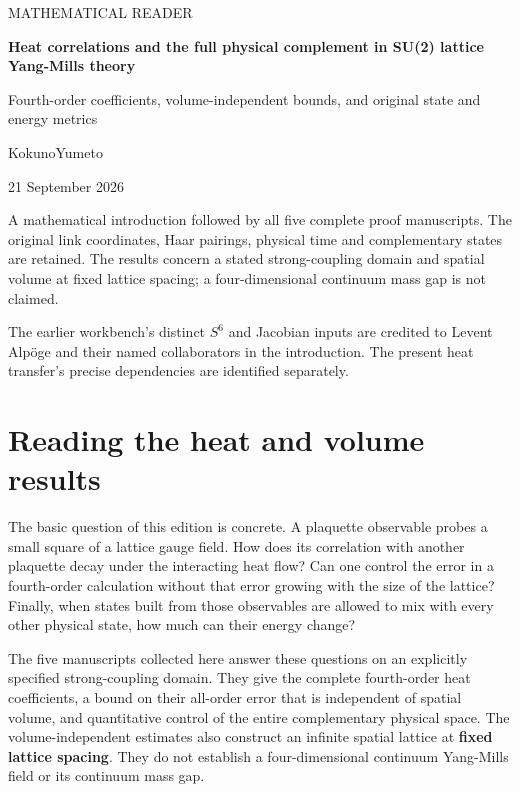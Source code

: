 \documentclass[11pt,a4paper]{article}
\let\originalsection\section
\renewcommand{\section}{\clearpage\originalsection}
\renewcommand{\[}{\begingroup\small\originaldisplaystart}
\renewcommand{\]}{\originaldisplayend\endgroup}
\begin{document}
\begin{titlepage}
\vspace*{14mm}
{\sffamily\Large MATHEMATICAL READER\par}
\vspace{12mm}
{\LARGE\bfseries Heat correlations and the full physical complement in
SU(2) lattice Yang-Mills theory\par}
\vspace{9mm}
{\large Fourth-order coefficients, volume-independent bounds, and
original state and energy metrics\par}
\vspace{13mm}
{\large KokunoYumeto\par}
\vspace{3mm}
{21 September 2026\par}
\vfill
\begin{minipage}{0.96\textwidth}
A mathematical introduction followed by all five complete proof manuscripts. The original link coordinates, Haar pairings, physical time and complementary states are retained. The results concern a stated strong-coupling domain and spatial volume at fixed lattice spacing; a four-dimensional continuum mass gap is not claimed.

\medskip
The earlier workbench's distinct \(S^6\) and Jacobian inputs are credited to Levent Alpöge and their named collaborators in the introduction. The present heat transfer's precise dependencies are identified separately.
\end{minipage}
\vspace{10mm}
\end{titlepage}
\tableofcontents
\clearpage
{}
\section{Reading the heat and volume
results}\label{reading-the-heat-and-volume-results}

The basic question of this edition is concrete. A plaquette observable
probes a small square of a lattice gauge field. How does its correlation
with another plaquette decay under the interacting heat flow? Can one
control the error in a fourth-order calculation without that error
growing with the size of the lattice? Finally, when states built from
those observables are allowed to mix with every other physical state,
how much can their energy change?

The five manuscripts collected here answer these questions on an
explicitly specified strong-coupling domain. They give the complete
fourth-order heat coefficients, a bound on their all-order error that is
independent of spatial volume, and quantitative control of the entire
complementary physical space. The volume-independent estimates also
construct an infinite spatial lattice at \textbf{fixed lattice spacing}.
They do not establish a four-dimensional continuum Yang-Mills field or
its continuum mass gap.
\end{document}
